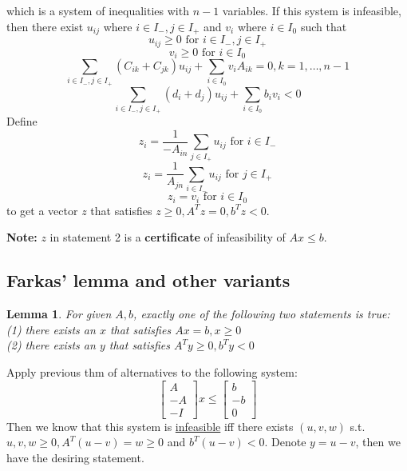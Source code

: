 \documentclass[10pt]{article}
\newtheorem{lemma}[thm]{Lemma}
\theoremstyle{definition}
\newcommand{\Note}[0]{\noindent\textbf{Note: }}
\begin{document}
which is a system of inequalities with $n-1$ variables. If this system is infeasible, then there exist $u_{ij}$ 
where $i \in I_{-}, j \in I_{+}$ and $v_{i}$ where $i \in I_{0}$ such that 
\begin{equation*}
	u_{ij} \ge 0 \text{ for } i \in I_{-}, j \in I_{+}
\end{equation*}
\begin{equation*}
	v_{i} \ge 0 \text{ for } i \in I_{0}
\end{equation*}
\begin{equation*}
	\sum_{i\in I_{-}, j \in I_{+}} (C_{ik} + C_{jk})u_{ij}  + \sum_{i\in I_{0}} v_{i}A_{ik} = 0, k = 1, \dots, n-1
\end{equation*}
\begin{equation*}
	\sum_{i\in I_{-}, j \in I_{+}} (d_{i} + d_{j})u_{ij} + \sum_{i\in I_{0}} b_{i}v_{i} < 0
\end{equation*}
Define 
\begin{equation*}
	z_{i} = \frac{1}{-A_{in}}\sum_{j\in I_{+}}u_{ij} \text{ for } i \in I_{-}
\end{equation*}
\begin{equation*}
	z_{i} = \frac{1}{A_{jn}}\sum_{i\in I_{-}}u_{ij} \text{ for } j \in I_{+}
\end{equation*}
\begin{equation*}
	z_{i} = v_{i} \text{ for } i \in I_{0}
\end{equation*}
to get a vector $z$ that satisfies $z \ge 0, A^Tz = 0, b^Tz < 0$.
\qedhere

\Note $z$ in statement 2 is a \textbf{certificate} of infeasibility of $Ax \le b$.

\subsection{Farkas’ lemma and other variants}

\begin{lemma}
	For given $A, b$, exactly one of the following two statements is true:\\
	(1) there exists an $x$ that satisfies $Ax = b, x\ge 0$\\
	(2) there exists an $y$ that satisfies $A^Ty \ge 0, b^Ty < 0$
\end{lemma}

\proof Apply previous thm of alternatives to the following system:
\begin{equation*}
	\begin{bmatrix}
		A \\ -A \\ -I
	\end{bmatrix} x \le
	\begin{bmatrix}
		b \\ -b \\ 0
	\end{bmatrix}
\end{equation*}
Then we know that this system is \underline{infeasible} iff there exists $(u,v,w)$ s.t.
$u, v, w \ge 0, A^T(u-v) = w \ge 0$ and $b^T(u-v) < 0$. Denote $y = u-v$, then we have the desiring
statement.
\end{document}
